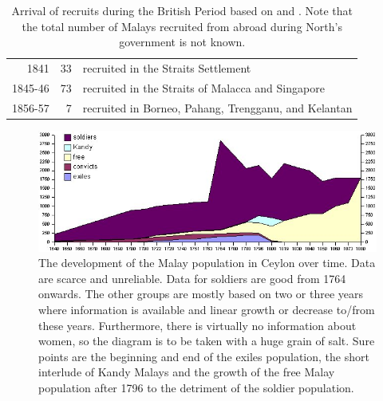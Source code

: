 \begin{table}
\begin{tabular}{rrl}
      1841 &  33    &\parbox[t]{8cm}{recruited in the Straits Settlement}\\
      1845-46 &73   &\parbox[t]{8cm}{recruited in the Straits of Malacca and Singapore}\\
      1856-57 &7    &\parbox[t]{8cm}{recruited in Borneo, Pahang, Trengganu, and Kelantan}\\
        \end{tabular}
    \caption[Arrival of recruits during the British Period]{Arrival of recruits during the British Period based on \citep[60ff]{Hussainmiya1987} and \citet[18]{Bichsel}. Note that the total number of Malays recruited from abroad during
North's government is not known.}
    \label{tab:RecruitsFromMalaysia}
\end{table}



\begin{figure}
	\centering
		\includegraphics[width=1.00\textwidth]{pics/Malaypopovertime}
	\caption[Development of the Malay population in Ceylon over time]{The development of the Malay population in Ceylon over time. Data are scarce and unreliable. Data for soldiers are good from 1764 onwards. The other groups are mostly based on two or three years where information is available and linear growth or decrease to/from these years. Furthermore, there is virtually no information about women, so the diagram is to be taken with a huge grain of salt. Sure points are the beginning and end of the exiles population, the short interlude of Kandy Malays and the growth of the free Malay population after 1796 to the detriment of the soldier population.}
	\label{fig:Malaypopovertime}
\end{figure}


